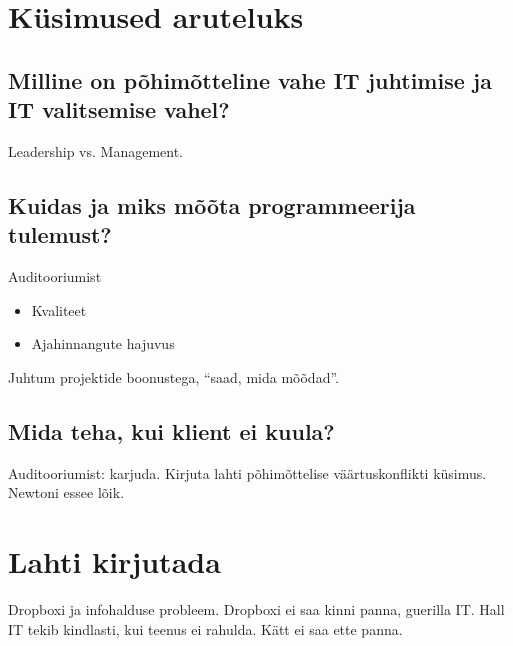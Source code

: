 \section{Küsimused aruteluks}
\subsection{Milline on põhimõtteline vahe IT juhtimise ja IT valitsemise vahel?}
Leadership vs. Management.

\subsection{Kuidas ja miks mõõta programmeerija tulemust?}
Auditooriumist
\begin{itemize}
	\item Kvaliteet
	\item Ajahinnangute hajuvus
\end{itemize}

Juhtum projektide boonustega, \enquote{saad, mida mõõdad}.

\subsection{Mida teha, kui klient ei kuula?}
Auditooriumist: karjuda. Kirjuta lahti põhimõttelise väärtuskonflikti küsimus. Newtoni essee lõik. 

\section{Lahti kirjutada}
Dropboxi ja infohalduse probleem. Dropboxi ei saa kinni panna, guerilla IT. Hall IT tekib kindlasti, kui teenus ei rahulda. Kätt ei saa ette panna.
